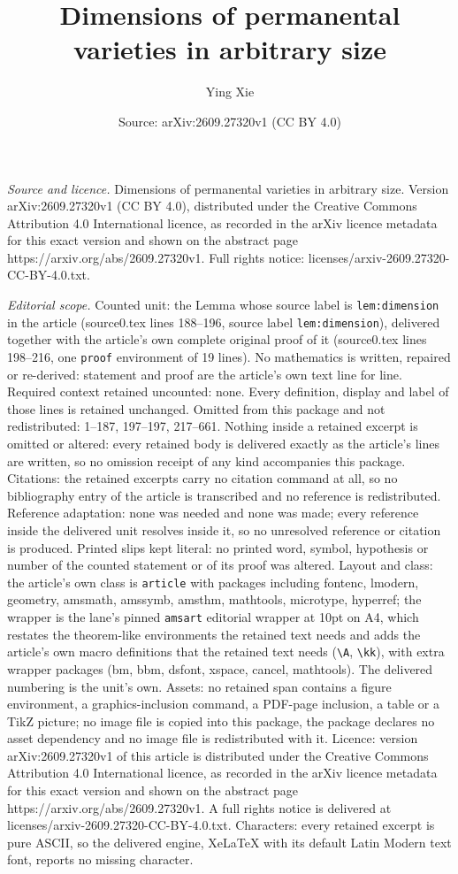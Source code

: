 \documentclass[10pt,a4paper]{amsart}
\title[Dimensions of permanental varieties in arbitrary size]{Dimensions of permanental varieties in arbitrary size}
\author{Ying Xie}
\date{Source: arXiv:2609.27320v1 (CC BY 4.0)}
\begin{document}
\maketitle

\noindent\emph{Source and licence.} Dimensions of permanental varieties in arbitrary size. Version arXiv:2609.27320v1 (CC BY 4.0), distributed under the Creative Commons Attribution 4.0 International licence, as recorded in the arXiv licence metadata for this exact version and shown on the abstract page https://arxiv.org/abs/2609.27320v1. Full rights notice: licenses/arxiv-2609.27320-CC-BY-4.0.txt.\par\smallskip

\noindent\textit{Editorial scope.} Counted unit: the Lemma whose source label is \texttt{lem:dimension} in the article (source0.tex lines 188--196, source label \texttt{lem:dimension}), delivered together with the article's own complete original proof of it (source0.tex lines 198--216, one \texttt{proof} environment of 19 lines). No mathematics is written, repaired or re-derived: statement and proof are the article's own text line for line. Required context retained uncounted: none. Every definition, display and label of those lines is retained unchanged. Omitted from this package and not redistributed: 1--187, 197--197, 217--661. Nothing inside a retained excerpt is omitted or altered: every retained body is delivered exactly as the article's lines are written, so no omission receipt of any kind accompanies this package. Citations: the retained excerpts carry no citation command at all, so no bibliography entry of the article is transcribed and no reference is redistributed. Reference adaptation: none was needed and none was made; every reference inside the delivered unit resolves inside it, so no unresolved reference or citation is produced. Printed slips kept literal: no printed word, symbol, hypothesis or number of the counted statement or of its proof was altered. Layout and class: the article's own class is \texttt{article} with packages including fontenc, lmodern, geometry, amsmath, amssymb, amsthm, mathtools, microtype, hyperref; the wrapper is the lane's pinned \texttt{amsart} editorial wrapper at 10pt on A4, which restates the theorem-like environments the retained text needs and adds the article's own macro definitions that the retained text needs (\texttt{\textbackslash A}, \texttt{\textbackslash kk}), with extra wrapper packages (bm, bbm, dsfont, xspace, cancel, mathtools). The delivered numbering is the unit's own. Assets: no retained span contains a figure environment, a graphics-inclusion command, a PDF-page inclusion, a table or a TikZ picture; no image file is copied into this package, the package declares no asset dependency and no image file is redistributed with it. Licence: version arXiv:2609.27320v1 of this article is distributed under the Creative Commons Attribution 4.0 International licence, as recorded in the arXiv licence metadata for this exact version and shown on the abstract page https://arxiv.org/abs/2609.27320v1. A full rights notice is delivered at licenses/arxiv-2609.27320-CC-BY-4.0.txt. Characters: every retained excerpt is pure ASCII, so the delivered engine, XeLaTeX with its default Latin Modern text font, reports no missing character.
\end{document}

